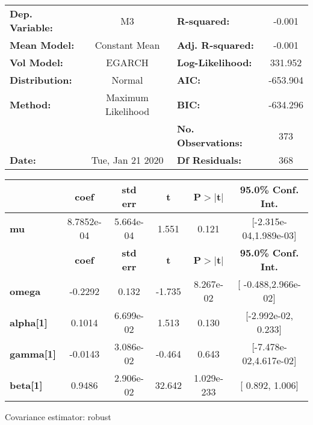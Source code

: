 \begin{center}
\begin{tabular}{lclc}
\toprule
\textbf{Dep. Variable:} &         M3         & \textbf{  R-squared:         } &    -0.001   \\
\textbf{Mean Model:}    &   Constant Mean    & \textbf{  Adj. R-squared:    } &    -0.001   \\
\textbf{Vol Model:}     &       EGARCH       & \textbf{  Log-Likelihood:    } &    331.952  \\
\textbf{Distribution:}  &       Normal       & \textbf{  AIC:               } &   -653.904  \\
\textbf{Method:}        & Maximum Likelihood & \textbf{  BIC:               } &   -634.296  \\
\textbf{}               &                    & \textbf{  No. Observations:  } &    373      \\
\textbf{Date:}          &  Tue, Jan 21 2020  & \textbf{  Df Residuals:      } &    368      \\
\bottomrule
\end{tabular}
\begin{tabular}{lccccc}
            & \textbf{coef} & \textbf{std err} & \textbf{t} & \textbf{P$>$$|$t$|$} & \textbf{95.0\% Conf. Int.}  \\
\midrule
\textbf{mu} &   8.7852e-04  &    5.664e-04     &     1.551  &          0.121       &   [-2.315e-04,1.989e-03]    \\
                  & \textbf{coef} & \textbf{std err} & \textbf{t} & \textbf{P$>$$|$t$|$} & \textbf{95.0\% Conf. Int.}  \\
\midrule
\textbf{omega}    &      -0.2292  &        0.132     &    -1.735  &      8.267e-02       &    [ -0.488,2.966e-02]      \\
\textbf{alpha[1]} &       0.1014  &    6.699e-02     &     1.513  &          0.130       &    [-2.992e-02,  0.233]     \\
\textbf{gamma[1]} &      -0.0143  &    3.086e-02     &    -0.464  &          0.643       &   [-7.478e-02,4.617e-02]    \\
\textbf{beta[1]}  &       0.9486  &    2.906e-02     &    32.642  &      1.029e-233      &     [  0.892,  1.006]       \\
\bottomrule
\end{tabular}
\end{center}

Covariance estimator: robust